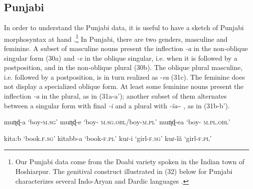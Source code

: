 \documentclass[output=paper]{langsci/langscibook}
\begin{document}
\subsection{Punjabi}%
In order to understand the Punjabi data, it is useful to have a sketch of Punjabi morphosyntax at hand \citep{Bhatia2000}.\footnote{{Our Punjabi data come} from the Doabi variety spoken in the Indian town of Hoshiarpur. {The genitival construct illustrated in (32) below for Punjabi characterizes several Indo-Aryan and Dardic languages \citep{Payne1995}.} }{} In Punjabi, there are two genders, masculine and feminine. A subset of masculine nouns present the inflection \textit{{}-a} in the non-oblique singular form (30a) and \textit{{}-e} in the oblique singular, i.e. when it is followed by a postposition, and in the non-oblique plural (30b). The oblique plural masculine, i.e. followed by a postposition, is in turn realized as -\textit{ea} (31c). The feminine does not display a specialized oblique form. At least some feminine nouns present the inflection \textit{{}-a} in the plural, as in (31a-a’); another subset of them alternates between a singular form with final \textit{{}-i} and a plural with \textit{{}-ĩa}\~{} , as in (31b-b’). 

\ea%
    \label{ex:manzini:30}
    \ea muɳɖ-a
        \glt ‘boy-\textsc{m.sg}’
    \ex muɳɖ-e
        \glt ‘boy- \textsc{m.sg.obl}/boy-\textsc{m.pl}’  
    \ex muɳɖ-ea
        \glt ‘boy- \textsc{m.pl.obl}’
\z
\z

\ea%
    \label{ex:manzini:31}
        \begin{xlista}
        \ex  kita:b        
        \glt ‘book.\textsc{f.sg}’
         kitabb-a      
        \glt      ‘book-\textsc{f.pl}’ 
        \ex   kuɾ-i         
        \glt  ‘girl-\textsc{f.sg}’
          kuɾ-ĩã         
        \glt      ‘girl-\textsc{f.pl}’
        \end{xlista}
\z
\end{document}
